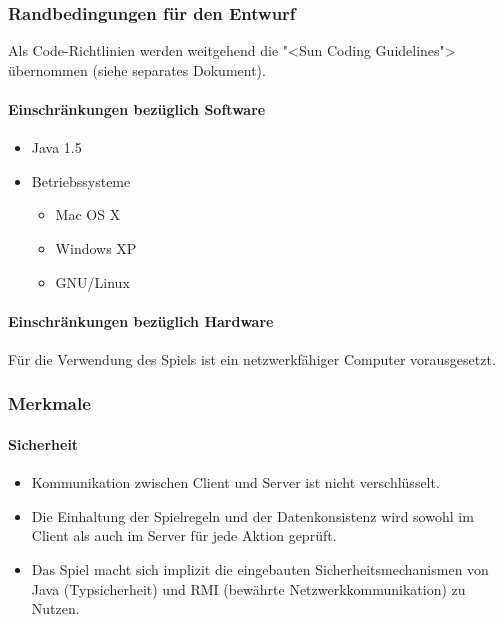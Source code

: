 \documentclass[a4paper,12pt,halfparskip,DIV14]{scrartcl}
\begin{document}
\subsubsection{Randbedingungen für den Entwurf}\label{ssub:randbedingungen_für_den_entwurf} %

Als Code-Richtlinien werden weitgehend die "<Sun Coding Guidelines"> übernommen (siehe separates Dokument).

\paragraph{Einschränkungen bezüglich Software}\label{ssub:einschränkungen_bzgl_software} %
\begin{itemize}
	\item Java 1.5
	\item Betriebssysteme
	\begin{itemize}
		\item Mac OS X
		\item Windows XP
		\item GNU/Linux
	\end{itemize}
\end{itemize}
\paragraph{Einschränkungen bezüglich Hardware}\label{ssub:einschränkungen_bzgl_hardware} %
Für die Verwendung des Spiels ist ein netzwerkfähiger Computer vorausgesetzt.

\subsubsection{Merkmale}\label{ssub:merkmale} %
\paragraph{Sicherheit}\label{ssub:sicherheit} %
\begin{itemize}
	\item Kommunikation zwischen Client und Server ist nicht verschlüsselt.
	\item Die Einhaltung der Spielregeln und der Datenkonsistenz wird sowohl im Client als auch im Server für jede Aktion geprüft.
	\item Das Spiel macht sich implizit die eingebauten Sicherheitsmechanismen von Java (Typsicherheit) und RMI (bewährte Netzwerkkommunikation) zu Nutzen.
\end{itemize}
\end{document}
